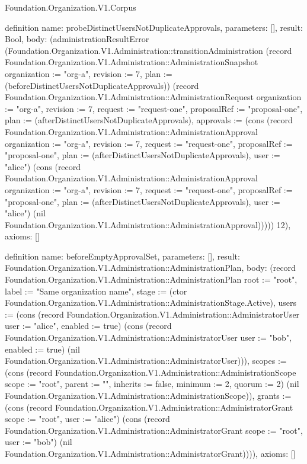 \begin{lexlean}{Foundation.Organization.V1.Corpus}
\begin{semanticmodule}
definition{
  name: probeDistinctUsersNotDuplicateApprovals,
  parameters: [],
  result: Bool,
  body: (administrationResultError (Foundation.Organization.V1.Administration::transitionAdministration (record Foundation.Organization.V1.Administration::AdministrationSnapshot {organization := "org-a", revision := 7, plan := (beforeDistinctUsersNotDuplicateApprovals)}) (record Foundation.Organization.V1.Administration::AdministrationRequest {organization := "org-a", revision := 7, request := "request-one", proposalRef := "proposal-one", plan := (afterDistinctUsersNotDuplicateApprovals), approvals := (cons (record Foundation.Organization.V1.Administration::AdministrationApproval {organization := "org-a", revision := 7, request := "request-one", proposalRef := "proposal-one", plan := (afterDistinctUsersNotDuplicateApprovals), user := "alice"}) (cons (record Foundation.Organization.V1.Administration::AdministrationApproval {organization := "org-a", revision := 7, request := "request-one", proposalRef := "proposal-one", plan := (afterDistinctUsersNotDuplicateApprovals), user := "alice"}) (nil Foundation.Organization.V1.Administration::AdministrationApproval)))})) 12),
  axioms: []
}

definition{
  name: beforeEmptyApprovalSet,
  parameters: [],
  result: Foundation.Organization.V1.Administration::AdministrationPlan,
  body: (record Foundation.Organization.V1.Administration::AdministrationPlan {root := "root", label := "Same organization name", stage := (ctor Foundation.Organization.V1.Administration::AdministrationStage.Active), users := (cons (record Foundation.Organization.V1.Administration::AdministratorUser {user := "alice", enabled := true}) (cons (record Foundation.Organization.V1.Administration::AdministratorUser {user := "bob", enabled := true}) (nil Foundation.Organization.V1.Administration::AdministratorUser))), scopes := (cons (record Foundation.Organization.V1.Administration::AdministrationScope {scope := "root", parent := "", inherits := false, minimum := 2, quorum := 2}) (nil Foundation.Organization.V1.Administration::AdministrationScope)), grants := (cons (record Foundation.Organization.V1.Administration::AdministratorGrant {scope := "root", user := "alice"}) (cons (record Foundation.Organization.V1.Administration::AdministratorGrant {scope := "root", user := "bob"}) (nil Foundation.Organization.V1.Administration::AdministratorGrant)))}),
  axioms: []
}


\end{semanticmodule}
\end{lexlean}
